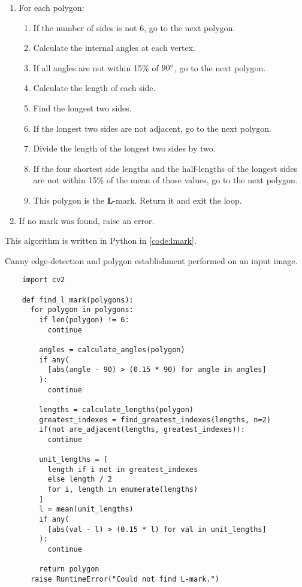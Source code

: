 \documentclass[12pt, letterpaper]{report}
\newcommand*{\itemref}[1]{\hypersetup{linkcolor=usfgreen}\hyperref[{#1}]{\autoref*{#1}}}
\begin{document}
\begin{enumerate}
  \item For each polygon:
    \begin{enumerate}
      \item If the number of sides is not 6, go to the next polygon.
      \item Calculate the internal angles at each vertex.
      \item If all angles are not within 15\% of $90\degree$, go to the next polygon.
      \item Calculate the length of each side.
      \item Find the longest two sides.
      \item If the longest two sides are not adjacent, go to the next polygon.
      \item Divide the length of the longest two sides by two.
      \item If the four shortest side lengths and the half-lengths of the
        longest sides are not within 15\% of the mean of those values, go to
        the next polygon.
      \item This polygon is the \textbf{L}-mark. Return it and exit the loop.
    \end{enumerate}
  \item If no mark was found, raise an error.
\end{enumerate}

This algorithm is written in Python in \itemref{code:lmark}.

\begin{codesample}[h]
  \caption{Canny edge-detection and polygon establishment performed on an input image.}
  \label{code:lmark}
  \begin{verbatim}
    import cv2

    def find_l_mark(polygons):
      for polygon in polygons:
        if len(polygon) != 6:
          continue

        angles = calculate_angles(polygon)
        if any(
          [abs(angle - 90) > (0.15 * 90) for angle in angles]
        ):
          continue

        lengths = calculate_lengths(polygon)
        greatest_indexes = find_greatest_indexes(lengths, n=2)
        if(not are_adjacent(lengths, greatest_indexes)):
          continue

        unit_lengths = [
          length if i not in greatest_indexes
          else length / 2 
          for i, length in enumerate(lengths)
        ]
        l = mean(unit_lengths)
        if any(
          [abs(val - l) > (0.15 * l) for val in unit_lengths]
        ):
          continue
        
        return polygon
      raise RuntimeError("Could not find L-mark.")
  \end{verbatim}
\end{codesample}
\end{document}
